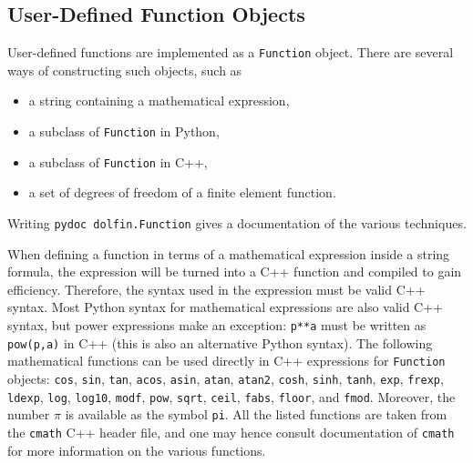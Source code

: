 \subsection{User-Defined Function Objects}
\label{langtangen:app:cpp:functions}

User-defined functions are implemented as a {\fontsize{12pt}{12pt}\texttt{Function}} object.
There are several ways of constructing such objects, such as
\begin{itemize}
\item a string containing a mathematical expression,
\item a subclass of {\fontsize{12pt}{12pt}\texttt{Function}} in Python,
\item a subclass of {\fontsize{12pt}{12pt}\texttt{Function}} in C++,
\item a set of degrees of freedom of a finite element function.
\end{itemize}
Writing {\fontsize{12pt}{12pt}\texttt{pydoc dolfin.Function}} gives a documentation of the various
techniques.

When defining a function in terms of a mathematical expression inside
a string formula, the expression will be turned into a C++ function
and compiled to gain efficiency. Therefore,
the syntax used in the expression must be valid C++ syntax.
Most Python syntax for mathematical expressions are also valid C++ syntax,
but power expressions make an exception: {\fontsize{12pt}{12pt}\texttt{p**a}} must be written as
{\fontsize{12pt}{12pt}\texttt{pow(p,a)}} in C++ (this is also an alternative Python syntax).
The following mathematical functions can be used directly
in C++
expressions for {\fontsize{12pt}{12pt}\texttt{Function}} objects:
{\fontsize{12pt}{12pt}\texttt{cos}}, {\fontsize{12pt}{12pt}\texttt{sin}}, {\fontsize{12pt}{12pt}\texttt{tan}}, {\fontsize{12pt}{12pt}\texttt{acos}}, {\fontsize{12pt}{12pt}\texttt{asin}},
{\fontsize{12pt}{12pt}\texttt{atan}}, {\fontsize{12pt}{12pt}\texttt{atan2}}, {\fontsize{12pt}{12pt}\texttt{cosh}}, {\fontsize{12pt}{12pt}\texttt{sinh}}, {\fontsize{12pt}{12pt}\texttt{tanh}}, {\fontsize{12pt}{12pt}\texttt{exp}},
{\fontsize{12pt}{12pt}\texttt{frexp}}, {\fontsize{12pt}{12pt}\texttt{ldexp}}, {\fontsize{12pt}{12pt}\texttt{log}}, {\fontsize{12pt}{12pt}\texttt{log10}}, {\fontsize{12pt}{12pt}\texttt{modf}},
{\fontsize{12pt}{12pt}\texttt{pow}}, {\fontsize{12pt}{12pt}\texttt{sqrt}}, {\fontsize{12pt}{12pt}\texttt{ceil}}, {\fontsize{12pt}{12pt}\texttt{fabs}}, {\fontsize{12pt}{12pt}\texttt{floor}}, and {\fontsize{12pt}{12pt}\texttt{fmod}}.
Moreover, the number $\pi$ is available as the symbol {\fontsize{12pt}{12pt}\texttt{pi}}.
All the listed functions are taken from the {\fontsize{12pt}{12pt}\texttt{cmath}} C++ header file, and
one may hence
consult documentation of {\fontsize{12pt}{12pt}\texttt{cmath}} for more information on the
various functions.



